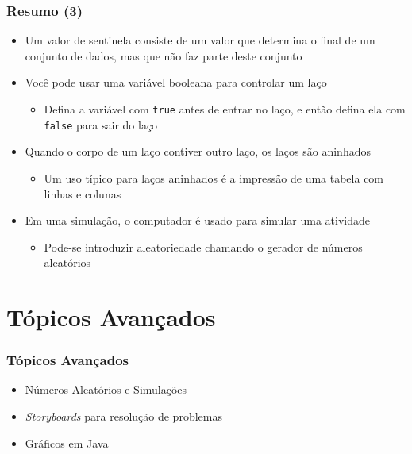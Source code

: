 \documentclass[xcolor={dvipsnames,table},aspectratio=169]{beamer}
\begin{document}
\begin{frame}\frametitle{Resumo (3)}
\begin{itemize}
	\item Um valor de sentinela consiste de um valor que determina o final de um conjunto de dados, mas que não faz parte deste conjunto
	\item Você pode usar uma variável booleana para controlar um laço
	\begin{itemize}
		\item Defina a variável com \texttt{true} antes de entrar no laço, e então defina ela com \texttt{false} para sair do laço
	\end{itemize}
	\item Quando o corpo de um laço contiver outro laço, os laços são aninhados
	\begin{itemize}
		\item Um uso típico para laços aninhados é a impressão de uma tabela com linhas e colunas
	\end{itemize}
	\item Em uma simulação, o computador é usado para simular uma atividade
	\begin{itemize}
		\item Pode-se introduzir aleatoriedade chamando o gerador de números aleatórios
	\end{itemize}
\end{itemize}
\end{frame}

\section{Tópicos Avançados}

\begin{frame}[fragile]\frametitle{Tópicos Avançados}
\begin{itemize}
	\item Números Aleatórios e Simulações
	\item \emph{Storyboards} para resolução de problemas
	\item Gráficos em Java
\end{itemize}
\end{frame}
\end{document}
